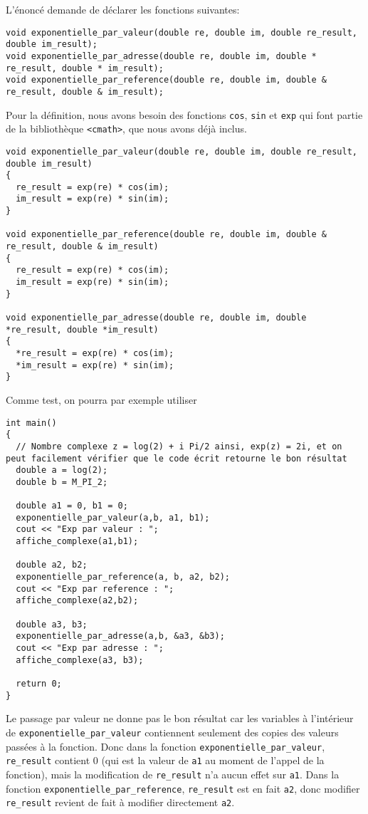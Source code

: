 \documentclass{book}
\newcommand{\inline}[1]{\texttt{#1}}
\begin{document}
\begin{correction}
L'énoncé demande de déclarer les fonctions suivantes:
\begin{verbatim}
void exponentielle_par_valeur(double re, double im, double re_result, double im_result);
void exponentielle_par_adresse(double re, double im, double * re_result, double * im_result);
void exponentielle_par_reference(double re, double im, double & re_result, double & im_result);
\end{verbatim}

Pour la définition, nous avons besoin des fonctions \inline{cos}, \inline{sin} et \inline{exp} qui font partie de la bibliothèque \inline{<cmath>}, que nous avons déjà inclus.
\begin{verbatim}
void exponentielle_par_valeur(double re, double im, double re_result, double im_result)
{
  re_result = exp(re) * cos(im);
  im_result = exp(re) * sin(im);
}

void exponentielle_par_reference(double re, double im, double & re_result, double & im_result)
{
  re_result = exp(re) * cos(im);
  im_result = exp(re) * sin(im);
}

void exponentielle_par_adresse(double re, double im, double *re_result, double *im_result)
{
  *re_result = exp(re) * cos(im);
  *im_result = exp(re) * sin(im);
}
\end{verbatim}

Comme test, on pourra par exemple utiliser
\begin{verbatim}
int main()
{
  // Nombre complexe z = log(2) + i Pi/2 ainsi, exp(z) = 2i, et on peut facilement vérifier que le code écrit retourne le bon résultat
  double a = log(2);
  double b = M_PI_2;

  double a1 = 0, b1 = 0;
  exponentielle_par_valeur(a,b, a1, b1);
  cout << "Exp par valeur : ";
  affiche_complexe(a1,b1);
  
  double a2, b2;
  exponentielle_par_reference(a, b, a2, b2);
  cout << "Exp par reference : ";
  affiche_complexe(a2,b2);

  double a3, b3;
  exponentielle_par_adresse(a,b, &a3, &b3);
  cout << "Exp par adresse : ";
  affiche_complexe(a3, b3);
  
  return 0;
}
\end{verbatim}
Le passage par valeur ne donne pas le bon résultat car les variables à l'intérieur de \texttt{exponentielle_par_valeur} contiennent seulement des copies des valeurs passées à la fonction. Donc dans la fonction \texttt{exponentielle_par_valeur}, \inline{re_result} contient 0 (qui est la valeur de \inline{a1} au moment de l'appel de la fonction), mais la modification de \inline{re_result} n'a aucun effet sur  \inline{a1}. Dans la fonction \texttt{exponentielle_par_reference}, \inline{re_result} est en fait \inline{a2}, donc modifier \inline{re_result} revient de fait à modifier directement \inline{a2}.
\end{correction}
\end{document}
